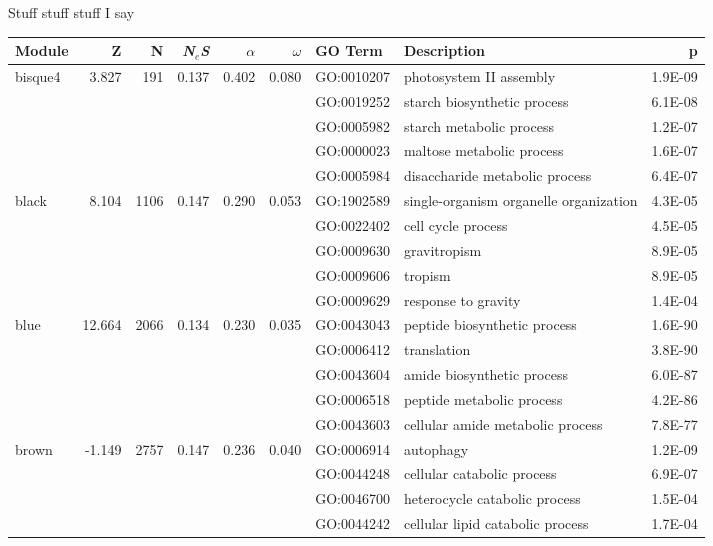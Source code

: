 \documentclass{ut-thesis}
\begin{document}
Stuff stuff stuff I say

\begin{landscape}

\begin{table}[ht]
\centering
\begin{tabular}{|l|rrrrrlP{5cm}r|}
  \hline
Module & Z & N & \textit{N$_{e}$S}& $\alpha$ & $\omega$ & GO Term & Description & p \\ 
  \hline
bisque4 & 3.827 & 191 & 0.137 & 0.402 & 0.080 & GO:0010207 & photosystem II assembly & 1.9E-09 \\ 
   &  &  &  &  &  & GO:0019252 & starch biosynthetic process & 6.1E-08 \\ 
   &  &  &  &  &  & GO:0005982 & starch metabolic process & 1.2E-07 \\ 
   &  &  &  &  &  & GO:0000023 & maltose metabolic process & 1.6E-07 \\ 
   &  &  &  &  &  & GO:0005984 & disaccharide metabolic process & 6.4E-07 \\ 
\hline
  black & 8.104 & 1106 & 0.147 & 0.290 & 0.053 & GO:1902589 & single-organism organelle organization & 4.3E-05 \\ 
   &  &  &  &  &  & GO:0022402 & cell cycle process & 4.5E-05 \\ 
   &  &  &  &  &  & GO:0009630 & gravitropism & 8.9E-05 \\ 
   &  &  &  &  &  & GO:0009606 & tropism & 8.9E-05 \\ 
   &  &  &  &  &  & GO:0009629 & response to gravity & 1.4E-04 \\ 
\hline  
blue & 12.664 & 2066 & 0.134 & 0.230 & 0.035 & GO:0043043 & peptide biosynthetic process & 1.6E-90 \\ 
   &  &  &  &  &  & GO:0006412 & translation & 3.8E-90 \\ 
   &  &  &  &  &  & GO:0043604 & amide biosynthetic process & 6.0E-87 \\ 
   &  &  &  &  &  & GO:0006518 & peptide metabolic process & 4.2E-86 \\ 
   &  &  &  &  &  & GO:0043603 & cellular amide metabolic process & 7.8E-77 \\ 
\hline  
brown & -1.149 & 2757 & 0.147 & 0.236 & 0.040 & GO:0006914 & autophagy & 1.2E-09 \\ 
   &  &  &  &  &  & GO:0044248 & cellular catabolic process & 6.9E-07 \\ 
   &  &  &  &  &  & GO:0046700 & heterocycle catabolic process & 1.5E-04 \\ 
   &  &  &  &  &  & GO:0044242 & cellular lipid catabolic process & 1.7E-04 \\ 

\end{tabular}
\end{table}
\end{landscape}
\end{document}
